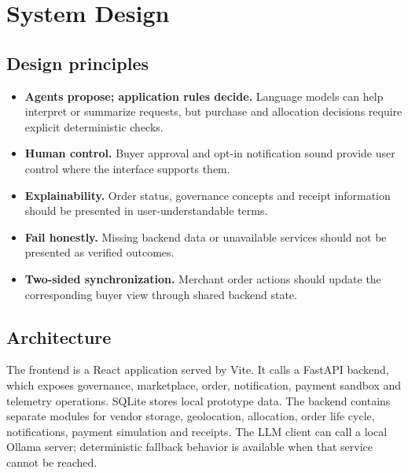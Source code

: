 \documentclass[12pt,a4paper]{report}
\begin{document}
\chapter{System Design}

\section{Design principles}
\begin{itemize}
  \item \textbf{Agents propose; application rules decide.} Language models can
        help interpret or summarize requests, but purchase and allocation
        decisions require explicit deterministic checks.
  \item \textbf{Human control.} Buyer approval and opt-in notification sound
        provide user control where the interface supports them.
  \item \textbf{Explainability.} Order status, governance concepts and
        receipt information should be presented in user-understandable terms.
  \item \textbf{Fail honestly.} Missing backend data or unavailable services
        should not be presented as verified outcomes.
  \item \textbf{Two-sided synchronization.} Merchant order actions should
        update the corresponding buyer view through shared backend state.
\end{itemize}

\section{Architecture}
The frontend is a React application served by Vite. It calls a FastAPI
backend, which exposes governance, marketplace, order, notification, payment
sandbox and telemetry operations. SQLite stores local prototype data. The
backend contains separate modules for vendor storage, geolocation, allocation,
order life cycle, notifications, payment simulation and receipts. The LLM
client can call a local Ollama server; deterministic fallback behavior is
available when that service cannot be reached.
\end{document}
